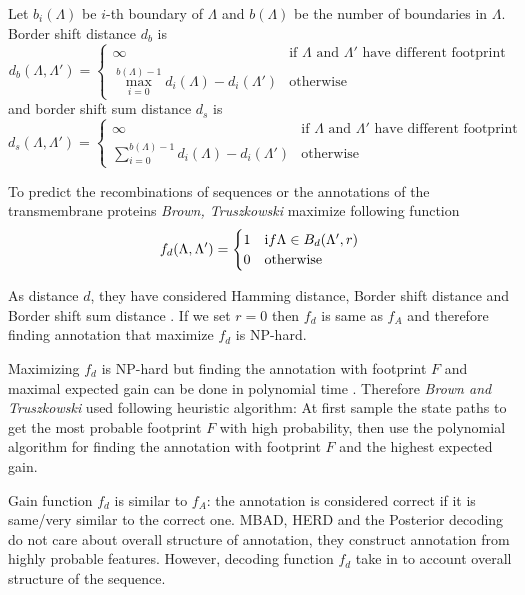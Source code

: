 \begin{definition}
Let $b_i(\Lambda)$ be $i$-th boundary of $\Lambda$ and $b(\Lambda)$ be the
number of boundaries in $\Lambda$.
Border shift distance $d_{b}$ is 
\begin{equation*}
d_{b}(\Lambda,\Lambda') = \begin{cases}
\infty & \text{if $\Lambda$ and $\Lambda'$ have different footprint}\\
\max_{i=0}^{b(\Lambda)-1} d_i(\Lambda)-d_i(\Lambda') & \text{otherwise}
\end{cases}
\end{equation*}
and border shift sum distance $d_s$ is 
\begin{equation*}
d_{s}(\Lambda,\Lambda') = \begin{cases}
\infty & \text{if $\Lambda$ and $\Lambda'$ have different footprint}\\
\sum_{i=0}^{b(\Lambda)-1} d_i(\Lambda)-d_i(\Lambda') & \text{otherwise}
\end{cases}
\end{equation*}

\end{definition}

To predict the recombinations of sequences or the annotations of the
transmembrane proteins {\it Brown,
Truszkowski} maximize following function
\begin{equation*}
f_d(\Lambda,\Lambda') = 
\begin{cases}
1 & {\text if }\Lambda\in B_d(\Lambda',r)\\
0 & \text{otherwise}
\end{cases}
\end{equation*}

As distance $d$, they have considered Hamming distance, Border shift distance
and Border shift sum distance \cite{Brown2010}.  If we set $r=0$ then $f_d$ is
same as $f_A$ and therefore finding annotation that maximize $f_d$ is NP-hard.

Maximizing $f_d$ is NP-hard but finding the  annotation with footprint $F$ and
maximal expected gain can be done in polynomial time \cite{Brown2010}. Therefore
{\it Brown and Truszkowski} used following heuristic algorithm: At first 
sample the state paths to get the most probable footprint $F$ with high probability,
then use the
polynomial algorithm for finding the annotation with footprint $F$ and the highest expected gain.

Gain function $f_d$ is similar to $f_A$: the annotation is considered correct if
it is same/very similar to the correct one. MBAD, HERD and the
Posterior decoding do not care about overall structure of annotation, they
construct annotation from highly probable features. However,
decoding function $f_d$ take in to account
overall structure of the sequence.
